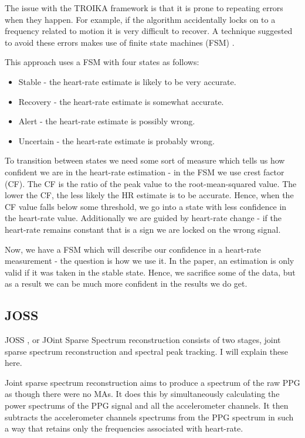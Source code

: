 \documentclass[12pt,a4paper,twoside,openright]{report}
\begin{document}
The issue with the TROIKA framework is that it is prone to repeating errors
when they happen. For example, if the algorithm accidentally locks on to a frequency
related to motion it is very difficult to recover. A technique
suggested to avoid these errors makes use of finite state machines (FSM)
\cite{Chung19}.

This approach uses a FSM with four states as follows: 

\begin{itemize}
	\item Stable - the heart-rate estimate is likely to be very accurate.
	\item Recovery - the heart-rate estimate is somewhat accurate.
	\item Alert - the heart-rate estimate is possibly wrong.
	\item Uncertain - the heart-rate estimate is probably wrong.
\end{itemize}

To transition between states we need some sort of measure which tells us how
confident we are in the heart-rate estimation - in the FSM we use crest factor
(CF). The CF is the ratio of the peak value to the root-mean-squared value.
The lower the CF, the less likely the HR estimate is to be accurate. Hence,
when the CF value falls below some threshold, we go into a state with less
confidence in the heart-rate value. Additionally we are guided by heart-rate
change - if the heart-rate remains constant that is a sign we are locked on
the wrong signal.

Now, we have a FSM which will describe our confidence in a heart-rate
measurement - the question is how we use it. In the paper, an estimation is
only valid if it was taken in the
stable state. Hence, we sacrifice some of the data, but as a result we can be
much more confident in the results we do get.

\subsection{JOSS}

JOSS \cite{Zhang15-2}, or JOint Sparse Spectrum reconstruction consists of two
stages, joint sparse spectrum reconstruction and spectral peak tracking. I
will explain these here.

Joint sparse spectrum reconstruction aims to produce a spectrum of the raw PPG
as though there were no MAs. It does this by simultaneously calculating the
power spectrums of the PPG signal and all the accelerometer channels. It then
subtracts the accelerometer channels spectrums from the PPG spectrum in such a
way that retains only the frequencies associated with heart-rate.
\end{document}
